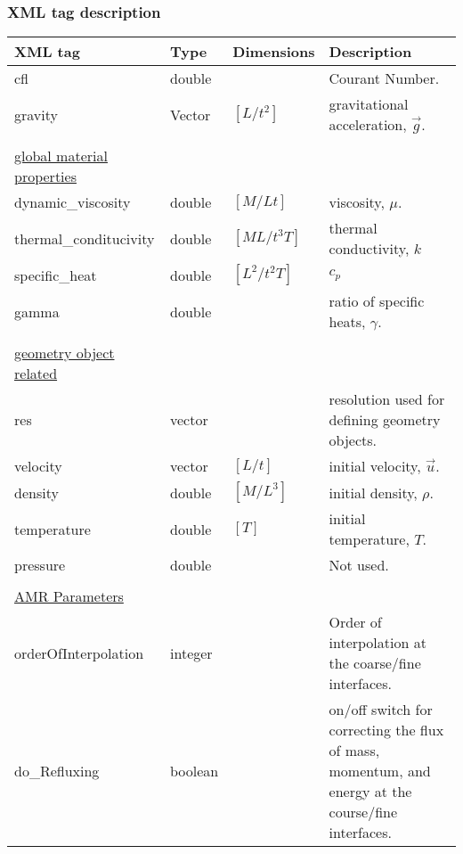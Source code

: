 \normalsize
\subsubsection{XML tag description}
\begin {center}
\begin{tabular}{lllp{8cm}}
\\
\footnotesize{XML tag} & \footnotesize{Type} & \footnotesize{Dimensions} & \footnotesize{Description}\\
\hline
\hline
cfl                   & double &               &    Courant Number.\\
gravity               & Vector & $[L/t^2]$     &    gravitational acceleration, $\vec{g}$.\\
\\
\underline{\footnotesize{global material properties}} & & &\\
dynamic\_viscosity    & double & $[M/Lt]$      &    viscosity, $\mu$.\\
thermal\_conditucivity& double & $[ML/t^3T]$   &    thermal conductivity, $k$\\
specific\_heat        & double & $ [L^2/t^2 T]$ &   $c_p$\\
gamma                 & double &               &    ratio of specific heats, $\gamma$.\\
\\
\underline{\footnotesize{geometry object related}} & & &\\
res                   & vector &               &    resolution used for defining geometry objects.\\
velocity              & vector & $[L/t]$       &    initial velocity, $\vec{u}$.\\
density               & double & $[M/L^3]$     &    initial density, $\rho$.\\
temperature           & double & $[T]$         &    initial temperature, $T$.\\
pressure              & double &               &    Not used. \\
\\
\underline{\footnotesize{AMR Parameters}} & & & \\
orderOfInterpolation  & integer &              &    Order of interpolation at the coarse/fine interfaces. \\
do\_Refluxing         & boolean &              &    on/off switch for correcting the flux of mass, momentum, and energy at the
                                                    course/fine interfaces.\\
\hline
\end{tabular}
\end{center}


